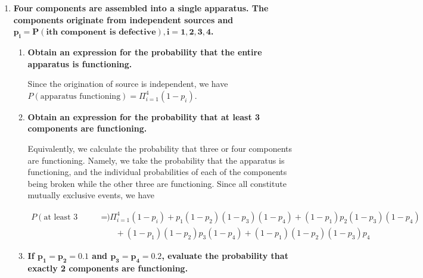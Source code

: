\documentclass[10pt, oneside]{article}   	%
\theoremstyle{definition}
\begin{document}
\begin{enumerate}[label=8.\arabic*]
\begin{enumerate}
	\end{enumerate}

\item  \begin{tcolorbox}[
  colback=Cerulean!5!white,
  colframe=Cerulean!75!black]
\textbf{Four components are assembled into a single apparatus. The components originate from independent sources and $\bm{p_i = P(i\text{th component is defective}), i = 1, 2, 3, 4}$.}
\end{tcolorbox}

	\begin{enumerate}
	\item  \begin{tcolorbox}[
	  colback=Cerulean!5!white,
	  colframe=Cerulean!75!black]
	\textbf{Obtain an expression for the probability that the entire apparatus is functioning.}
	\end{tcolorbox}
	
	Since the origination of source is independent, we have $\boxed{ P(\text{apparatus functioning}) = \Pi^4_{i=1} (1-p_i) }$.
	
	\item  \begin{tcolorbox}[
	  colback=Cerulean!5!white,
	  colframe=Cerulean!75!black]
	\textbf{Obtain an expression for the probability that at least 3 components are functioning.}
	\end{tcolorbox}
	
	Equivalently, we calculate the probability that three or four components are functioning. Namely, we take the probability that the apparatus is functioning, and the individual probabilities of each of the components being broken while the other three are functioning. Since all constitute mutually exclusive events, we have
	
	\begin{align*}
	P(\text{at least 3 functioning}) &= \Pi^4_{i=1} (1-p_i) + p_1 (1-p_2)(1-p_3)(1-p_4) + (1-p_1) p_2 (1-p_3) (1-p_4)  \\
	&\quad \quad + (1-p_1)(1-p_2) p_3 (1-p_4) + (1-p_1) (1- p_2) (1-p_3) p_4
	\end{align*}
	
	\item  \begin{tcolorbox}[
	  colback=Cerulean!5!white,
	  colframe=Cerulean!75!black]
	\textbf{If $\bm{p_1 = p_2 = 0.1}$ and $\bm{p_3 = p_4 = 0.2}$, evaluate the probability that exactly 2 components are functioning.}
	\end{tcolorbox}
	

\end{enumerate}
\end{enumerate}
\end{document}
